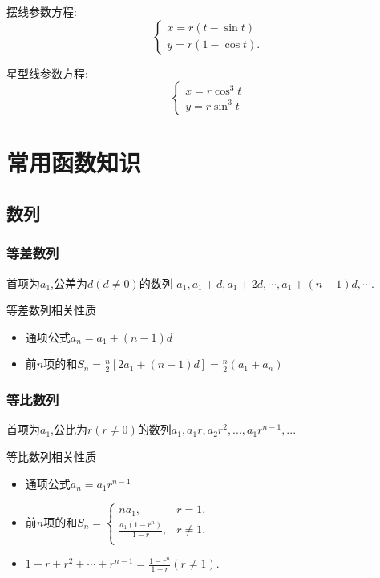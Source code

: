 \documentclass[12pt, a4paper, oneside, UTF8]{ctexbook}  %
\begin{document}
摆线参数方程:
$$
    \left\{
    \begin{array}{l}
        x=r\left(t-\sin t\right) \\
        y=r\left(1-\cos t\right).
    \end{array}
    \right.
$$

星型线参数方程:
$$
    \left\{
    \begin{array}{l}
        x=r \cos^3 t \\
        y=r \sin^3 t
    \end{array}
    \right.
$$
\section{常用函数知识}

\subsection{数列}
\subsubsection{等差数列}
首项为$a_1$,公差为$d(d \neq 0)$的数列 $a_1,a_1+d,a_1+2d,\cdots,a_1+(n-1)d,\cdots$.

\begin{criterion}{等差数列相关性质}{}
    \begin{itemize}
        \item 通项公式$a_n=a_1+(n-1)d$
        \item 前$n$项的和$S_n=\frac{n}{2}[2a_1+(n-1)d]=\frac{n}{2}(a_1+a_n)$
    \end{itemize}
\end{criterion}

\subsubsection{等比数列}
首项为$a_1$,公比为$r(r \neq 0)$的数列$a_1,a_1r,a_2r^2,...,a_1r^{n-1},...$
\begin{criterion}{等比数列相关性质}{}
    \begin{itemize}
        \item 通项公式$a_n=a_1r^{n-1}$
        \item 前$n$项的和$S_{n}=\left\{\begin{matrix}{na_{1},}&{r=1,}\\{\frac{a_{1}\left(1-r^{n}\right)}{1-r},}&{r\neq1.}\\\end{matrix}\right.$
        \item $1+r+r^2+\cdots+r^{n-1}=\frac{1-r^n}{1-r}(r\neq1).$
    \end{itemize}
\end{criterion}
\end{document}
